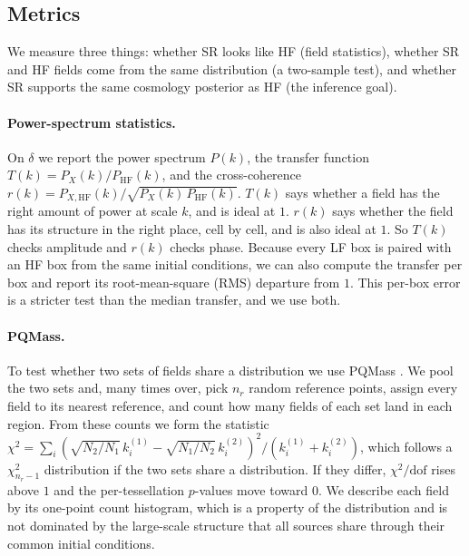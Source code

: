 \documentclass{article} %
\begin{document}
\subsection{Metrics}

We measure three things: whether SR looks like HF (field statistics), whether SR
and HF fields come from the same distribution (a two-sample test), and whether SR
supports the same cosmology posterior as HF (the inference goal).

\paragraph{Power-spectrum statistics.} On $\delta$ we report the power spectrum
$P(k)$, the transfer function $T(k)=P_X(k)/P_\mathrm{HF}(k)$, and the
cross-coherence
$r(k)=P_{X,\mathrm{HF}}(k)/\sqrt{P_X(k)\,P_\mathrm{HF}(k)}$. $T(k)$ says whether a
field has the right amount of power at scale $k$, and is ideal at $1$. $r(k)$ says
whether the field has its structure in the right place, cell by cell, and is also
ideal at $1$. So $T(k)$ checks amplitude and $r(k)$ checks phase. Because every LF
box is paired with an HF box from the same initial conditions, we can also compute
the transfer per box and report its root-mean-square (RMS) departure from $1$. This
per-box error is a stricter test than the median transfer, and we use both.

\paragraph{PQMass.} To test whether two sets of fields share a distribution we use
PQMass \citep{lemos2024pqmass}. We pool the two sets and, many times over, pick
$n_r$ random reference points, assign every field to its nearest reference, and
count how many fields of each set land in each region. From these counts we form
the statistic
$\chi^2=\sum_i (\sqrt{N_2/N_1}\,k^{(1)}_i-\sqrt{N_1/N_2}\,k^{(2)}_i)^2/(k^{(1)}_i+k^{(2)}_i)$,
which follows a $\chi^2_{n_r-1}$ distribution if the two sets share a
distribution. If they differ, $\chi^2/\mathrm{dof}$ rises above $1$ and the
per-tessellation $p$-values move toward $0$. We describe each field by its
one-point count histogram, which is a property of the distribution and is not
dominated by the large-scale structure that all sources share through their common
initial conditions.
\end{document}
